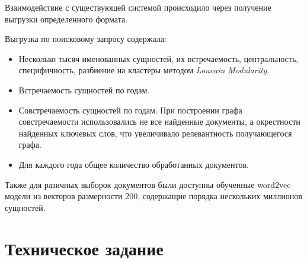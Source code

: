 Взаимодействие с существующей системой происходило через получение выгрузки определенного формата.

Выгрузка по поисковому запросу содержала:

\begin{itemize}
\item Несколько тысяч именованных сущностей, их встречаемость, центральность, специфичность, разбиение на кластеры методом {\itshape Louvain Modularity}.
\item Встречаемость сущностей по годам.
\item Совстречаемость сущностей по годам. При построении графа совстречаемости использовались не все найденные документы, а окрестности найденных ключевых слов, что увеличивало релевантность получающегося графа.
\item Для каждого года общее количество обработанных документов.
\end{itemize}

Также для разичных выборок документов были доступны обученные word2vec модели из векторов размерности 200, содержащие порядка нескольких миллионов сущностей.

\section{Техническое задание}

